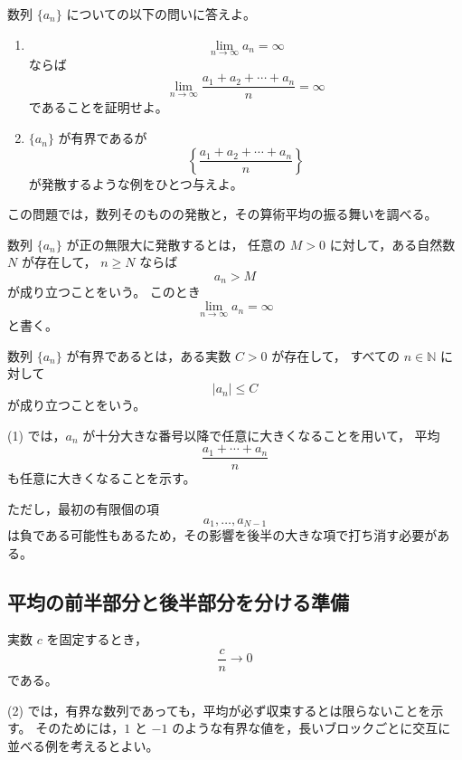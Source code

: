 \begin{exercise}
    数列 $\{a_n\}$ についての以下の問いに答えよ。

    \begin{enumerate}
        \item
        \[
            \lim_{n\to\infty} a_n=\infty
        \]
        ならば
        \[
            \lim_{n\to\infty}
            \frac{a_1+a_2+\cdots+a_n}{n}
            =\infty
        \]
        であることを証明せよ。

        \item
        $\{a_n\}$ が有界であるが
        \[
            \left\{
                \frac{a_1+a_2+\cdots+a_n}{n}
            \right\}
        \]
        が発散するような例をひとつ与えよ。
    \end{enumerate}
\end{exercise}
\begin{background}
    この問題では，数列そのものの発散と，その算術平均の振る舞いを調べる。

    \begin{definition}[正の無限大への発散]
        数列 $\{a_n\}$ が正の無限大に発散するとは，
        任意の $M>0$ に対して，ある自然数 $N$ が存在して，
        $n\geq N$ ならば
        \[
            a_n>M
        \]
        が成り立つことをいう。
        このとき
        \[
            \lim_{n\to\infty}a_n=\infty
        \]
        と書く。
    \end{definition}

    \begin{definition}[有界な数列]
        数列 $\{a_n\}$ が有界であるとは，ある実数 $C>0$ が存在して，
        すべての $n\in\mathbb{N}$ に対して
        \[
            |a_n|\leq C
        \]
        が成り立つことをいう。
    \end{definition}

    \begin{remark}
    (1) では，$a_n$ が十分大きな番号以降で任意に大きくなることを用いて，
    平均
        \[
            \frac{a_1+\cdots+a_n}{n}
        \]
        も任意に大きくなることを示す。

        ただし，最初の有限個の項
        \[
            a_1,\ldots,a_{N-1}
        \]
        は負である可能性もあるため，その影響を後半の大きな項で打ち消す必要がある。
    \end{remark}

    \subsection{平均の前半部分と後半部分を分ける準備}

    \begin{lemma}[有限個の和の影響は平均で消える]
        実数 $c$ を固定するとき，
        \[
            \frac{c}{n}\to 0
        \]
        である。
    \end{lemma}

    \begin{remark}
    (2) では，有界な数列であっても，平均が必ず収束するとは限らないことを示す。
        そのためには，$1$ と $-1$ のような有界な値を，長いブロックごとに交互に並べる例を考えるとよい。
    \end{remark}
\end{background}
